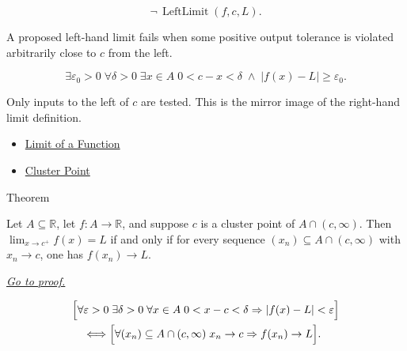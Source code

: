 \begin{remark*}
\[
  \neg\,\operatorname{LeftLimit}(f,c,L).
\]
\end{remark*}

\begin{remark*}
A proposed left-hand limit fails when some positive output tolerance is
violated arbitrarily close to $c$ from the left.
\end{remark*}

\begin{remark*}
\[
  \exists\varepsilon_0>0\;\forall\delta>0\;\exists x\in A\;
  0<c-x<\delta\;\wedge\; |f(x)-L|\geq\varepsilon_0.
\]
\end{remark*}

\begin{remark*}[Interpretation]
Only inputs to the left of $c$ are tested. This is the mirror image of
the right-hand limit definition.
\end{remark*}

\begin{dependencies}
\begin{itemize}
  \item \hyperref[def:limit-function]{Limit of a Function}
  \item \hyperref[def:cluster-point-r]{Cluster Point}
\end{itemize}
\end{dependencies}


\begin{theorembox}{Theorem}
\begin{theorem}
\label{thm:sequential-criterion-right-hand-limit}
Let $A\subseteq\mathbb{R}$, let $f:A\to\mathbb{R}$, and suppose $c$ is a
cluster point of $A\cap(c,\infty)$. Then $\lim_{x\to c^+}f(x)=L$ if and
only if for every sequence $(x_n)\subseteq A\cap(c,\infty)$ with
$x_n\to c$, one has $f(x_n)\to L$.

\smallskip\noindent
\hyperref[prf:sequential-criterion-right-hand-limit]{\textit{Go to proof.}}
\end{theorem}
\end{theorembox}

\begin{remark*}
\[
\begin{aligned}
&\Bigl[\forall\varepsilon>0\;\exists\delta>0\;\forall x\in A\;
  0<x-c<\delta\Rightarrow |f(x)-L|<\varepsilon\Bigr] \\
&\quad\Longleftrightarrow
\Bigl[\forall (x_n)\subseteq A\cap(c,\infty)\;
  x_n\to c\Rightarrow f(x_n)\to L\Bigr].
\end{aligned}
\]
\end{remark*}

